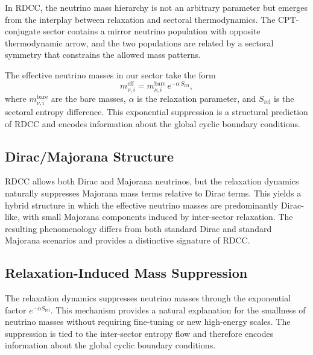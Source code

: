 \documentclass[11pt,a4paper]{article}
\newcommand{\alphaR}{\alpha}
\begin{document}
In RDCC, the neutrino mass hierarchy is not an arbitrary parameter but emerges
from the interplay between relaxation and sectoral thermodynamics. The
CPT-conjugate sector contains a mirror neutrino population with opposite
thermodynamic arrow, and the two populations are related by a sectoral symmetry
that constrains the allowed mass patterns.

The effective neutrino masses in our sector take the form
\begin{equation}
m_{\nu,i}^{\mathrm{eff}}
    = m_{\nu,i}^{\mathrm{bare}}\, e^{-\alphaR\, S_{\mathrm{rel}}},
\end{equation}
where $m_{\nu,i}^{\mathrm{bare}}$ are the bare masses, $\alphaR$ is the
relaxation parameter, and $S_{\mathrm{rel}}$ is the sectoral entropy difference.
This exponential suppression is a structural prediction of RDCC and encodes
information about the global cyclic boundary conditions.




\subsection{Dirac/Majorana Structure}

RDCC allows both Dirac and Majorana neutrinos, but the relaxation dynamics
naturally suppresses Majorana mass terms relative to Dirac terms. This yields a
hybrid structure in which the effective neutrino masses are predominantly
Dirac-like, with small Majorana components induced by inter-sector relaxation.
The resulting phenomenology differs from both standard Dirac and standard
Majorana scenarios and provides a distinctive signature of RDCC.




\subsection{Relaxation-Induced Mass Suppression}

The relaxation dynamics suppresses neutrino masses through the exponential
factor $e^{-\alphaR S_{\mathrm{rel}}}$. This mechanism provides a natural
explanation for the smallness of neutrino masses without requiring fine-tuning
or new high-energy scales. The suppression is tied to the inter-sector entropy
flow and therefore encodes information about the global cyclic boundary
conditions.
\end{document}
